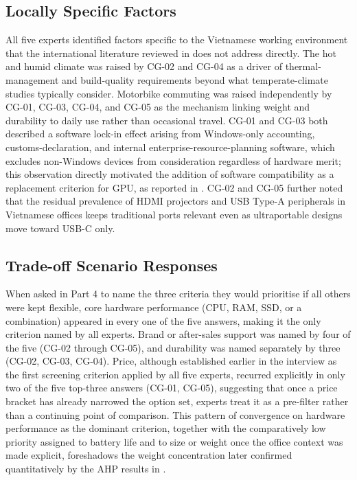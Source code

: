 \subsection{Locally Specific Factors}

All five experts identified factors specific to the Vietnamese working environment that the
international literature reviewed in  does not address directly.
The hot and humid climate was raised by CG-02 and CG-04 as a driver of thermal-management
and build-quality requirements beyond what temperate-climate studies typically consider.
Motorbike commuting was raised independently by CG-01, CG-03, CG-04, and CG-05 as the
mechanism linking weight and durability to daily use rather than occasional travel. CG-01
and CG-03 both described a software lock-in effect arising from Windows-only accounting,
customs-declaration, and internal enterprise-resource-planning software, which excludes
non-Windows devices from consideration regardless of hardware merit; this observation
directly motivated the addition of software compatibility as a replacement criterion for
GPU, as reported in . CG-02 and CG-05 further noted that
the residual prevalence of HDMI projectors and USB Type-A peripherals in Vietnamese offices
keeps traditional ports relevant even as ultraportable designs move toward USB-C only.

\subsection{Trade-off Scenario Responses}

When asked in Part 4 to name the three criteria they would prioritise if all others were
kept flexible, core hardware performance (CPU, RAM, SSD, or a combination) appeared in every
one of the five answers, making it the only criterion named by all experts. Brand or
after-sales support was named by four of the five (CG-02 through CG-05), and durability was
named separately by three (CG-02, CG-03, CG-04). Price, although established earlier in the
interview as the first screening criterion applied by all five experts, recurred explicitly
in only two of the five top-three answers (CG-01, CG-05), suggesting that once a price
bracket has already narrowed the option set, experts treat it as a pre-filter rather than a
continuing point of comparison. This pattern of convergence on hardware performance as the
dominant criterion, together with the comparatively low priority assigned to battery life
and to size or weight once the office context was made explicit, foreshadows the weight
concentration later confirmed quantitatively by the AHP results in .
